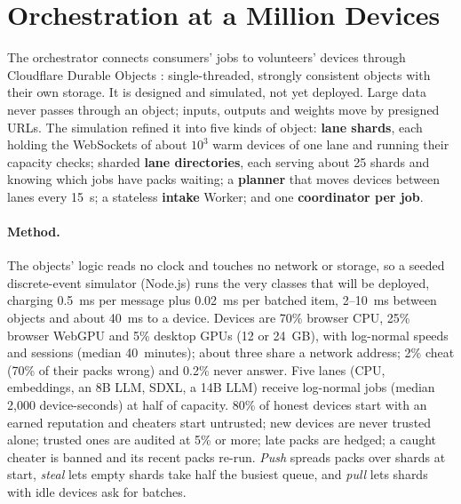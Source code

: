\documentclass[11pt,a4paper]{article}
\theoremstyle{definition}
\theoremstyle{plain}
\begin{document}
\begin{table}[ht]
\centering
\caption{Competitive dispatch, $f=0.20$, $q=3$, adversary on 400 networks. ``Latency'' is time to
acceptance in units of the median device's compute time. ``Fast/slow credit'' is the mean credit of
the fastest quartile of honest devices divided by that of the slowest quartile.}\label{tab:race}
\resizebox{\linewidth}{!}{}
\end{table}

\section{Orchestration at a Million Devices}\label{sec:orch}

The orchestrator connects consumers' jobs to volunteers' devices through Cloudflare Durable Objects
\citep{cfdurable}: single-threaded, strongly consistent objects with their own storage. It is designed and
simulated, not yet deployed. Large data never passes through an object; inputs, outputs and weights move by
presigned URLs. The simulation refined it into five kinds of object: \textbf{lane shards}, each holding the
WebSockets of about $10^3$ warm devices of one lane and running their capacity checks; sharded \textbf{lane
directories}, each serving about 25 shards and knowing which jobs have packs waiting; a \textbf{planner} that
moves devices between lanes every 15~s; a stateless \textbf{intake} Worker; and one \textbf{coordinator per
job}.

\paragraph{Method.} The objects' logic reads no clock and touches no network or storage, so a seeded
discrete-event simulator (Node.js) runs the very classes that will be deployed, charging 0.5~ms per message plus
0.02~ms per batched item, 2--10~ms between objects and about 40~ms to a device. Devices are 70\% browser CPU, 25\%
browser WebGPU and 5\% desktop GPUs (12 or 24~GB), with log-normal speeds and sessions (median 40~minutes); about
three share a network address; 2\% cheat (70\% of their packs wrong) and 0.2\% never answer. Five lanes (CPU,
embeddings, an 8B LLM, SDXL, a 14B LLM) receive log-normal jobs (median 2{,}000 device-seconds) at half of
capacity. 80\% of honest devices start with an earned reputation and cheaters start untrusted; new devices are
never trusted alone; trusted ones are audited at 5\% or more; late packs are hedged; a
caught cheater is banned and its recent packs re-run. \emph{Push} spreads packs over shards at start, \emph{steal}
lets empty shards take half the busiest queue, and \emph{pull} lets shards with idle devices ask for batches.
\end{document}
